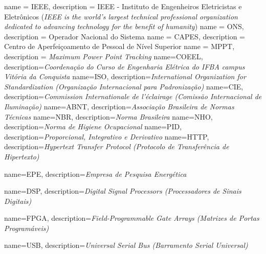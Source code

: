 %
%
{
  name = {IEEE},
  description = {IEEE - Instituto de 
      Engenheiros Eletricistas e Eletrônicos (\textit{IEEE is the world's largest technical professional organization dedicated to advancing technology for the benefit of humanity})}
}
{
  name = {ONS},
  description = {Operador Nacional do 
      Sistema}
}
{
   name = {CAPES},
   description = {Centro de Aperfeiçoamento 
       de Pessoal de Nível Superior}
}
{
   name = {MPPT},
   description = {\textit{Maximum Power 
       Point Tracking}}
}
{
   name={COEEL},
   description={\textit{Coordenação do Curso de Engenharia Elétrica do IFBA campus Vitória da Conquista}}
}
{
   name={ISO},
   description={\textit{International Organization for Standardization (Organização Internacional para Padronização)}}
}
{
   name={CIE},
   description={\textit{Commission Internationale de l'éclairage (Comissão Internacional de Iluminação)}}
}
{
   name={ABNT},
   description={\textit{Associação Brasileira de Normas Técnicas}}
}
{
   name={NBR},
   description={\textit{Norma Brasileira}}
}
{
   name={NHO},
   description={\textit{Norma de Higiene Ocupacional}}
}
{
   name={PID},
   description={\textit{Proporcional, Integrativo e Derivativo}}
}
{
   name={HTTP},
   description={\textit{Hypertext Transfer Protocol (Protocolo de Transferência de Hipertexto)}}
}

{
   name={EPE},
   description={\textit{Empresa de Pesquisa Energética}}
}

{
   name={DSP},
   description={\textit{Digital Signal Processors (Processadores de Sinais Digitais)}}
}

{
   name={FPGA},
   description={\textit{Field-Programmable Gate Arrays (Matrizes de Portas Programáveis)}}
}

{
   name={USB},
   description={\textit{Universal Serial Bus (Barramento Serial Universal)}}
}

